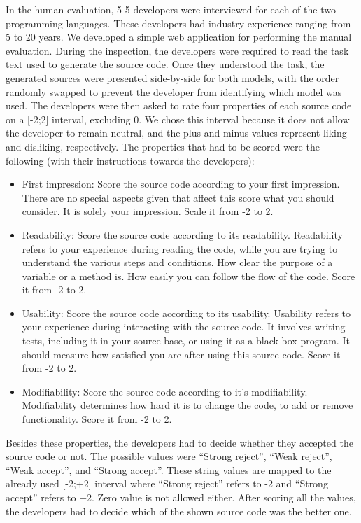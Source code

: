 In the human evaluation, 5-5 developers were interviewed for each of the two programming languages. These developers had industry experience ranging from 5 to 20 years.
We developed a simple web application for performing the manual evaluation.
During the inspection, the developers were required to read the task text used to generate the source code.
Once they understood the task, the generated sources were presented side-by-side for both models, with the order randomly swapped to prevent the developer from identifying which model was used.
The developers were then asked to rate four properties of each source code on a [-2;2] interval, excluding 0.
We chose this interval because it does not allow the developer to remain neutral, and the plus and minus values represent liking and disliking, respectively.
The properties that had to be scored were the following (with their instructions towards the developers):
\begin{itemize}
	\item First impression: Score the source code according to your first impression. There are no special aspects given that affect this score what you should consider. It is solely your impression. Scale it from -2 to 2.
	\item Readability: Score the source code according to its readability. Readability refers to your experience during reading the code, while you are trying to understand the various steps and conditions. How clear the purpose of a variable or a method is. How easily you can follow the flow of the code. Score it from -2 to 2.
	\item Usability: Score the source code according to its usability. Usability refers to your experience during interacting with the source code. It involves writing tests, including it in your source base, or using it as a black box program. It should measure how satisfied you are after using this source code. Score it from -2 to 2.
	\item Modifiability: Score the source code according to it's modifiability. Modifiability determines how hard it is to change the code, to add or remove functionality. Score it from -2 to 2.
\end{itemize}

Besides these properties, the developers had to decide whether they accepted the source code or not.
The possible values were ``Strong reject'', ``Weak reject'', ``Weak accept'', and ``Strong accept''.
These string values are mapped to the already used [-2;+2] interval where ``Strong reject'' refers to -2 and ``Strong accept'' refers to +2.
Zero value is not allowed either.
After scoring all the values, the developers had to decide which of the shown source code was the better one.


